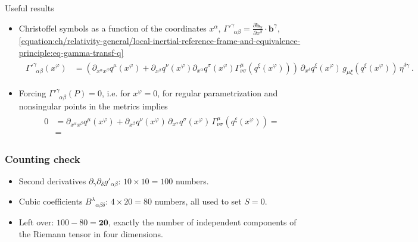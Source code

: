 \documentclass[letterpaper,10pt,english]{jupyterBook}
\begin{document}
\sphinxAtStartPar
Useful results
\begin{itemize}
\item {} 
\sphinxAtStartPar
Christoffel symbols as a function of the coordinates \(x^\alpha\), \({\Gamma'}^{\gamma}_{\ \ \alpha \beta} = \tfrac{\partial \mathbf{b}_{\alpha}}{\partial x^{\beta}} \cdot \mathbf{b}^{\gamma}\), \eqref{equation:ch/relativity-general/local-inertial-reference-frame-and-equivalence-principle:eq-gamma-transf-q}
\begin{equation*}
\begin{split}\begin{aligned}
     {\Gamma'}^{\gamma}_{\ \ \alpha \beta}(x^\varphi) 
     & = \left(  \partial_{x^\alpha x^\beta} q^{\mu} (x^\varphi) + \partial_{x^\beta} q^{\nu}(x^\varphi) \partial_{x^\alpha} q^{\sigma}(x^\varphi) \Gamma_{\nu \sigma}^{\mu}(q^{\xi}(x^\varphi)) \right) \, \partial_{x^\delta} q^{\xi}(x^\varphi)  \, g_{\mu \xi}(q^\xi(x^\varphi)) \, \eta^{\delta \gamma} \ .
   \end{aligned}\end{split}
\end{equation*}
\item {} 
\sphinxAtStartPar
Forcing \({\Gamma'}^{\gamma}_{\ \ \alpha \beta}(P) = 0\), i.e. for \(x^\varphi = 0\), for regular parametrization and non\sphinxhyphen{}singular points in the metrics implies
\begin{equation*}
\begin{split}\begin{aligned}
     0
     & = \partial_{x^\alpha x^\beta} q^{\mu} (x^\varphi) + \partial_{x^\beta} q^{\nu}(x^\varphi) \, \partial_{x^\alpha} q^{\sigma}(x^\varphi) \, \Gamma_{\nu \sigma}^{\mu}(q^{\xi}(x^\varphi)) = \\
     & = 
   \end{aligned}\end{split}
\end{equation*}
\end{itemize}


\subsubsection{Counting check}
\label{\detokenize{ch/relativity-general/local-inertial-reference-frame-and-equivalence-principle:counting-check}}\begin{itemize}
\item {} 
\sphinxAtStartPar
Second derivatives \(\partial_\gamma\partial_\delta g'_{\alpha\beta}\): \(10\times10=100\) numbers.

\item {} 
\sphinxAtStartPar
Cubic coefficients \(B^\lambda{}_{\alpha\beta\delta}\): \(4\times20=80\) numbers, all used to set \(S=0\).

\item {} 
\sphinxAtStartPar
Left over: \(100-80=\mathbf{20}\), exactly the number of independent components of the Riemann tensor in four dimensions.

\end{itemize}
\end{document}
